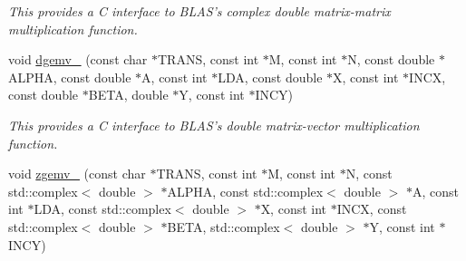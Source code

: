 \begin{DoxyCompactItemize}
\begin{DoxyCompactList}\small\item\em This provides a C interface to B\-L\-A\-S's complex double matrix-\/matrix multiplication function. \end{DoxyCompactList}\item 
\hypertarget{namespacekeycpp_af0676a4a89dbb63f09fc627c05e12699}{void \hyperlink{namespacekeycpp_af0676a4a89dbb63f09fc627c05e12699}{dgemv\-\_\-} (const char $\ast$T\-R\-A\-N\-S, const int $\ast$M, const int $\ast$N, const double $\ast$A\-L\-P\-H\-A, const double $\ast$A, const int $\ast$L\-D\-A, const double $\ast$X, const int $\ast$I\-N\-C\-X, const double $\ast$B\-E\-T\-A, double $\ast$Y, const int $\ast$I\-N\-C\-Y)}\label{namespacekeycpp_af0676a4a89dbb63f09fc627c05e12699}

\begin{DoxyCompactList}\small\item\em This provides a C interface to B\-L\-A\-S's double matrix-\/vector multiplication function. \end{DoxyCompactList}\item 
\hypertarget{namespacekeycpp_aea174778653491b5fd21dd2960c0f7cb}{void \hyperlink{namespacekeycpp_aea174778653491b5fd21dd2960c0f7cb}{zgemv\-\_\-} (const char $\ast$T\-R\-A\-N\-S, const int $\ast$M, const int $\ast$N, const std\-::complex$<$ double $>$ $\ast$A\-L\-P\-H\-A, const std\-::complex$<$ double $>$ $\ast$A, const int $\ast$L\-D\-A, const std\-::complex$<$ double $>$ $\ast$X, const int $\ast$I\-N\-C\-X, const std\-::complex$<$ double $>$ $\ast$B\-E\-T\-A, std\-::complex$<$ double $>$ $\ast$Y, const int $\ast$I\-N\-C\-Y)}\label{namespacekeycpp_aea174778653491b5fd21dd2960c0f7cb}


\end{DoxyCompactItemize}
